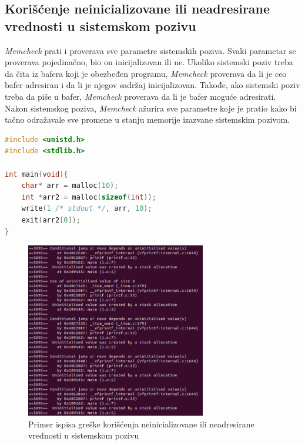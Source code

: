 \documentclass[12pt,oneside]{memoir}
\theoremstyle{plain}
\theoremstyle{definition}
\begin{document}
\subsection{Korišćenje neinicializovane ili neadresirane vrednosti u sistemskom pozivu}

\textit{Memcheck} prati i proverava sve parametre sistemskih poziva. Svaki parametar se proverava pojedinačno, bio on inicijalizovan ili ne. Ukoliko sistemski poziv treba da čita iz bafera  koji je obezbeđen programu, \textit{Memcheck} proverava da li je ceo bafer adresiran i da li je njegov sadržaj inicijalizovan. Takođe, ako sistemski poziv treba da piše u bafer, \textit{Memcheck} proverava da li je bafer moguće adresirati. Nakon sistemskog poziva, \textit{Memcheck} ažurira sve parametre koje je pratio kako bi tačno odražavale sve promene u stanju memorije izazvane sistemskim pozivom.

\begin{lstlisting}[caption={Program koji izaziva grešku korišćenja neinicializovane ili neadresirane vrednosti u sistemskom pozivu, izvor: \cite{Memcheck}}, label={lst:slika2.6},language={C}] 
#include <unistd.h>
#include <stdlib.h>

int main(void){
	char* arr = malloc(10);
	int *arr2 = malloc(sizeof(int));
	write(1 /* stdout */, arr, 10);
	exit(arr2[0]);
}
\end{lstlisting}


\begin{figure}[!ht]
  \centering
  \includegraphics[width=0.7\textwidth]{sysCallError.png}
  \caption{Primer ispisa greške korišćenja neinicializovane ili neadresirane vrednosti u sistemskom pozivu}
  \label{fig:slika2.7}
\end{figure}
\end{document}
